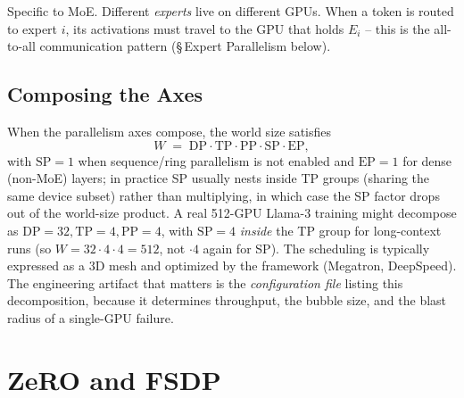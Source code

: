Specific to MoE. Different \emph{experts} live on different GPUs.
When a token is routed to expert $i$, its activations must travel to
the GPU that holds $E_i$ -- this is the all-to-all communication
pattern (\S\,Expert Parallelism below).

\subsection{Composing the Axes}

When the parallelism axes compose, the world size satisfies
\begin{equation*}
W \;=\; \mathrm{DP} \cdot \mathrm{TP} \cdot \mathrm{PP} \cdot
        \mathrm{SP} \cdot \mathrm{EP},
\end{equation*}
with $\mathrm{SP} = 1$ when sequence/ring parallelism is not
enabled and $\mathrm{EP} = 1$ for dense (non-MoE) layers; in
practice SP usually nests inside TP groups (sharing the same
device subset) rather than multiplying, in which case the SP factor
drops out of the world-size product. A real 512-GPU Llama-3
training might decompose as $\mathrm{DP}=32, \mathrm{TP}=4,
\mathrm{PP}=4$, with $\mathrm{SP}=4$ \emph{inside} the TP group for
long-context runs (so $W = 32 \cdot 4 \cdot 4 = 512$, not
$\cdot 4$ again for SP). The scheduling is typically expressed as
a 3D mesh and optimized by the framework (Megatron, DeepSpeed). The
engineering artifact that matters is the \emph{configuration file}
listing this decomposition, because it determines throughput, the
bubble size, and the blast radius of a single-GPU failure.

\section{ZeRO and FSDP}

